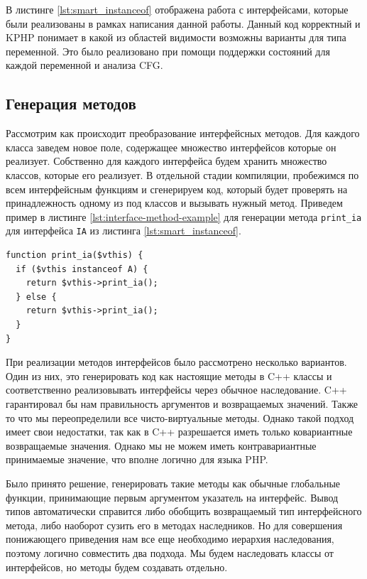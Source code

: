 В листинге \ref{lst:smart_instanceof} отображена работа с интерфейсами, которые были реализованы в рамках написания данной работы.
Данный код корректный и KPHP понимает в какой из областей видимости возможны варианты для типа переменной.
Это было реализовано при помощи поддержки состояний для каждой переменной и анализа CFG.

\subsection{Генерация методов}
Рассмотрим как происходит преобразование интерфейсных методов.
Для каждого класса заведем новое поле, содержащее множество интерфейсов которые он реализует.
Собственно для каждого интерфейса будем хранить множество классов, которые его реализует.
В отдельной стадии компиляции, пробежимся по всем интерфейсным функциям и сгенерируем код, который будет проверять на принадлежность одному из под классов и вызывать нужный метод.
Приведем пример в листинге \ref{lst:interface-method-example} для генерации метода \verb|print_ia| для интерфейса \verb|IA| из листинга \ref{lst:smart_instanceof}.
\begin{lstlisting}[caption={Пример генерации интерфейсного метода},label={lst:interface-method-example}]
function print_ia($vthis) {
  if ($vthis instanceof A) {
    return $vthis->print_ia();
  } else {
    return $vthis->print_ia();
  }
}
\end{lstlisting}

При реализации методов интерфейсов было рассмотрено несколько вариантов.
Один из них, это генерировать код как настоящие методы в C++ классы и соответственно реализовывать интерфейсы через обычное наследование.
C++ гарантировал бы нам правильность аргументов и возвращаемых значений.
Также то что мы переопределили все чисто-виртуальные методы.
Однако такой подход имеет свои недостатки, так как в C++ разрешается иметь только ковариантные возвращаемые значения.
Однако мы не можем иметь контравариантные принимаемые значение, что вполне логично для языка PHP.

Было принято решение, генерировать такие методы как обычные глобальные функции, принимающие первым аргументом указатель на интерфейс.
Вывод типов автоматически справится либо обобщить возвращаемый тип интерфейсного метода, либо наоборот сузить его в методах наследников.
Но для совершения понижающего приведения нам все еще необходимо иерархия наследования, поэтому логично совместить два подхода.
Мы будем наследовать классы от интерфейсов, но методы будем создавать отдельно.


